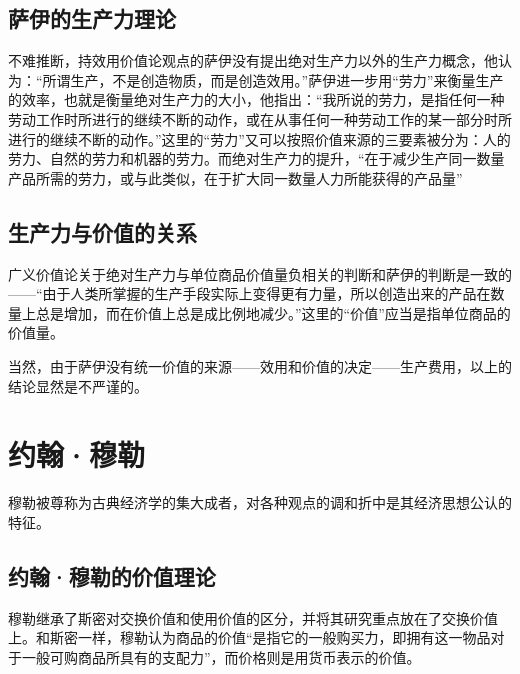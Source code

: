 \subsection{萨伊的生产力理论}

不难推断，持效用价值论观点的萨伊没有提出绝对生产力以外的生产力概念，他认为：“所谓生产，不是创造物质，而是创造效用。”\cite[60]{SaYiZhengZhiJingJiXueGaiLunCaiFuDeShengChanFenPeiHeXiaoFei2020}萨伊进一步用“劳力”来衡量生产的效率，也就是衡量绝对生产力的大小，他指出：“我所说的劳力，是指任何一种劳动工作时所进行的继续不断的动作，或在从事任何一种劳动工作的某一部分时所进行的继续不断的动作。”\cite[90]{SaYiZhengZhiJingJiXueGaiLunCaiFuDeShengChanFenPeiHeXiaoFei2020}这里的“劳力”又可以按照价值来源的三要素被分为：人的劳力、自然的劳力和机器的劳力\cite[90]{SaYiZhengZhiJingJiXueGaiLunCaiFuDeShengChanFenPeiHeXiaoFei2020}。而绝对生产力的提升，“在于减少生产同一数量产品所需的劳力，或与此类似，在于扩大同一数量人力所能获得的产品量”\cite[91]{SaYiZhengZhiJingJiXueGaiLunCaiFuDeShengChanFenPeiHeXiaoFei2020}

\subsection{生产力与价值的关系}

广义价值论关于绝对生产力与单位商品价值量负相关的判断和萨伊的判断是一致的——“由于人类所掌握的生产手段实际上变得更有力量，所以创造出来的产品在数量上总是增加，而在价值上总是成比例地减少。”\cite[369]{SaYiZhengZhiJingJiXueGaiLunCaiFuDeShengChanFenPeiHeXiaoFei2020}这里的“价值”应当是指单位商品的价值量。

当然，由于萨伊没有统一价值的来源——效用和价值的决定——生产费用，以上的结论显然是不严谨的。

\section{约翰·穆勒}

 穆勒被尊称为古典经济学的集大成者，对各种观点的调和折中是其经济思想公认的特征\cite[165]{YanZhiJieXiFangJingJiXueShuoShiJiaoChengDiErBan2013}\cite[176-178]{CaiJiMingCongGuDianZhengZhiJingJiXueDaoZhongGuoTeSeSheHuiZhuYiZhengZhiJingJiXueJiYuZhongGuoShiJiaoDeZhengZhiJingJiXueYanBianShangCe2023}。
 
 \subsection{约翰·穆勒的价值理论}

 穆勒继承了斯密对交换价值和使用价值的区分，并将其研究重点放在了交换价值上。和斯密一样，穆勒认为商品的价值“是指它的一般购买力，即拥有这一物品对于一般可购商品所具有的支配力”，而价格则是用货币表示的价值\cite[493]{YueHan*MuLeZhengZhiJingJiXueYuanLiJiQiZaiSheHuiZheXueShangDeRuoGanYingYongShangJuan1991}。

